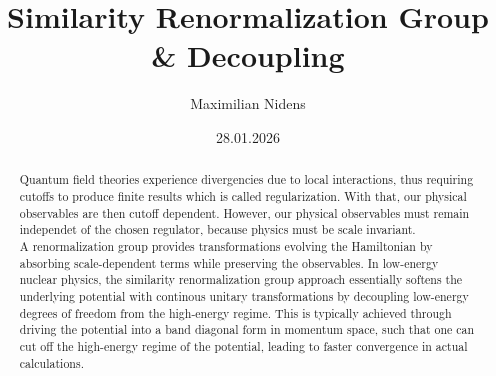 \documentclass[11pt]{article}
\title{Similarity Renormalization Group & Decoupling}
\author{Maximilian Nidens}
\date{28.01.2026}
\begin{document}
\begin{abstract}
Quantum field theories experience divergencies due to local interactions, thus requiring cutoffs to 
produce finite results which is called regularization.
With that, our physical observables are then cutoff dependent. However, our physical observables must remain independet of 
the chosen regulator, because physics must be scale invariant.\\
A renormalization group provides transformations evolving the Hamiltonian by absorbing scale-dependent terms while preserving
the observables. 
In low-energy nuclear physics, the similarity renormalization group approach essentially softens
the underlying potential with continous unitary transformations by decoupling low-energy degrees of freedom from the high-energy
regime. This is typically achieved through driving the potential into a band diagonal form in momentum space, such that 
one can cut off the high-energy regime of the potential, leading to faster convergence in actual calculations.
\end{abstract}
\end{document}

